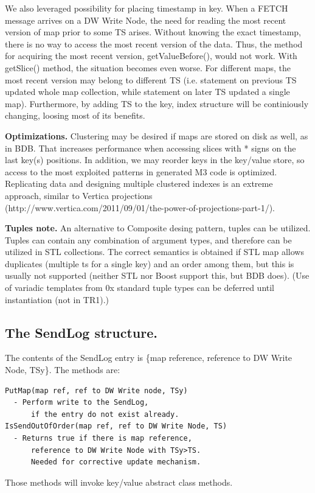 \documentclass{sig-semester}
\def\M3{M3\xspace}
\begin{document}
We also leveraged possibility for placing timestamp in key. When a FETCH message arrives on a DW Write Node, the need for reading the most recent version of map prior to some TS arises. Without knowing the exact timestamp, there is no way to access the most recent version of the data. Thus, the method for acquiring the most recent version, getValueBefore(), would not work. With getSlice() method, the situation becomes even worse. For different maps, the most recent version may belong to different TS (i.e. statement on previous TS updated whole map collection, while statement on later TS updated a single map). Furthermore, by adding TS to the key, index structure will be continiously changing, loosing most of its benefits.

\textbf{Optimizations.} Clustering may be desired if maps are stored on disk as well, as in BDB. That increases performance when accessing slices with * signs on the last key(s) positions. In addition, we may reorder keys in the key/value store, so access to the most exploited patterns in generated \M3 code is optimized. Replicating data and designing multiple clustered indexes is an extreme approach, similar to Vertica projections (http://www.vertica.com/2011/09/01/the-power-of-projections-part-1/).

\textbf{Tuples note.} An alternative to Composite desing pattern, tuples can be utilized. Tuples can contain any combination of argument types, and therefore can be utilized in STL collections. The correct semantics is obtained if STL map allows duplicates (multiple ts for a single key) and an order among them, but this is usually not supported (neither STL nor Boost support this, but BDB does). (Use of variadic templates from 0x standard tuple types can be deferred until instantiation (not in TR1).)

\subsection{The SendLog structure.}
The contents of the SendLog entry is \{map reference, reference to DW Write Node, TSy\}. The methods are:
\begin{verbatim}
PutMap(map ref, ref to DW Write node, TSy)
  - Perform write to the SendLog, 
      if the entry do not exist already.
IsSendOutOfOrder(map ref, ref to DW Write Node, TS)
  - Returns true if there is map reference, 
      reference to DW Write Node with TSy>TS. 
      Needed for corrective update mechanism. 
\end{verbatim}
Those methods will invoke key/value abstract class methods.
\end{document}
